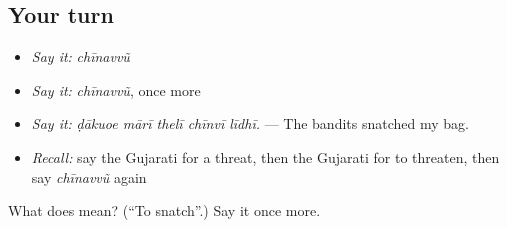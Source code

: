 \subsection*{Your turn}
\begin{itemize}
\raggedright
  \item \emph{Say it:} \emph{chīnavvũ}
  \item \emph{Say it:} \emph{chīnavvũ}, once more
  \item \emph{Say it:} \emph{ḍākuoe mārī thelī chīnvī līdhī.} — The bandits snatched my bag.
  \item \emph{Recall:} say the Gujarati for a threat, then the Gujarati for to threaten, then say \emph{chīnavvũ} again
\end{itemize}

\begin{tcolorbox}[breakable,colback=teal!4,colframe=teal!35!black,title={Before you move on}]
What does  mean? (\textquotedblleft{}To snatch\textquotedblright{}.) Say it once more.
\end{tcolorbox}
